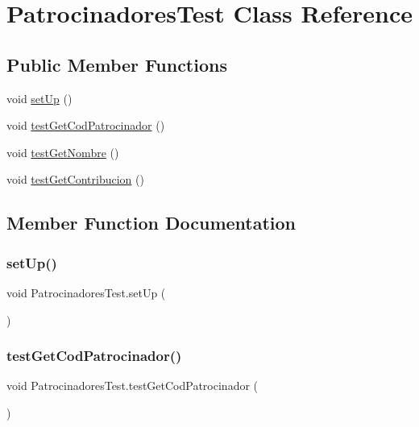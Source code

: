 \hypertarget{class_patrocinadores_test}{}\section{Patrocinadores\+Test Class Reference}
\label{class_patrocinadores_test}
\subsection*{Public Member Functions}
\begin{DoxyCompactItemize}
\item 
void \mbox{\hyperlink{class_patrocinadores_test_a9412503b1c164a5a69b5287fda9121f7}{set\+Up}} ()
\item 
void \mbox{\hyperlink{class_patrocinadores_test_a96427a38dff510a0afd35674a0531ebd}{test\+Get\+Cod\+Patrocinador}} ()
\item 
void \mbox{\hyperlink{class_patrocinadores_test_a5a9f3783461fac8e1706b9dbd7896919}{test\+Get\+Nombre}} ()
\item 
void \mbox{\hyperlink{class_patrocinadores_test_a740bbee7fb1c4d7cd0df399e26a3707b}{test\+Get\+Contribucion}} ()
\end{DoxyCompactItemize}


\subsection{Member Function Documentation}
\mbox{\label{class_patrocinadores_test_a9412503b1c164a5a69b5287fda9121f7}} 
\subsubsection{\texorpdfstring{setUp()}{setUp()}}
{\footnotesize\ttfamily void Patrocinadores\+Test.\+set\+Up (\begin{DoxyParamCaption}{ }\end{DoxyParamCaption})}

\mbox{\label{class_patrocinadores_test_a96427a38dff510a0afd35674a0531ebd}} 
\subsubsection{\texorpdfstring{testGetCodPatrocinador()}{testGetCodPatrocinador()}}
{\footnotesize\ttfamily void Patrocinadores\+Test.\+test\+Get\+Cod\+Patrocinador (\begin{DoxyParamCaption}{ }\end{DoxyParamCaption})}

